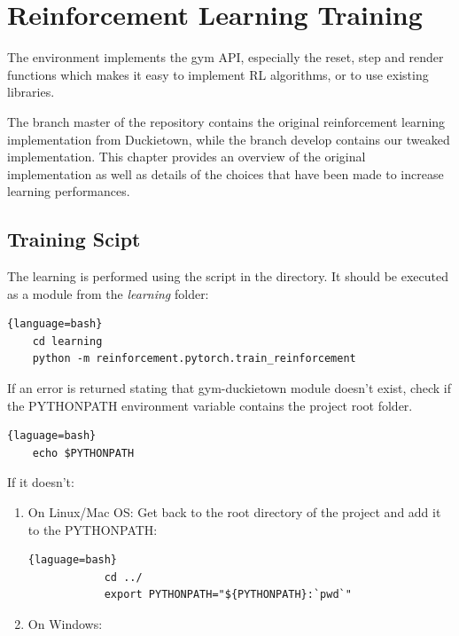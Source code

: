 \chapter{Reinforcement Learning Training}

The environment implements the gym API, especially the reset, step and render functions which makes it easy to implement RL algorithms, or to use existing libraries.

The branch master of the repository\cite{forked_gym_duckietown} contains the original reinforcement learning implementation from Duckietown, while the branch develop contains our tweaked implementation.
This chapter provides an overview of the original implementation as well as details of the choices that have been made to increase learning performances.

\section{Training Scipt}

The learning is performed using the  script in the  directory.
It should be executed as a module from the \textit{learning} folder:

\begin{lstlisting}{language=bash}
    cd learning
    python -m reinforcement.pytorch.train_reinforcement
\end{lstlisting}

If an error is returned stating that gym-duckietown module doesn't exist, check if the PYTHONPATH environment variable contains the project root folder.

\begin{lstlisting}{laguage=bash}
    echo $PYTHONPATH
\end{lstlisting}

If it doesn't:
\begin{enumerate}
    \item On Linux/Mac OS:
        Get back to the root directory of the project and add it to the PYTHONPATH:
        \begin{lstlisting}{laguage=bash}
            cd ../
            export PYTHONPATH="${PYTHONPATH}:`pwd`"
        \end{lstlisting}
    \item On Windows:

\end{enumerate}

